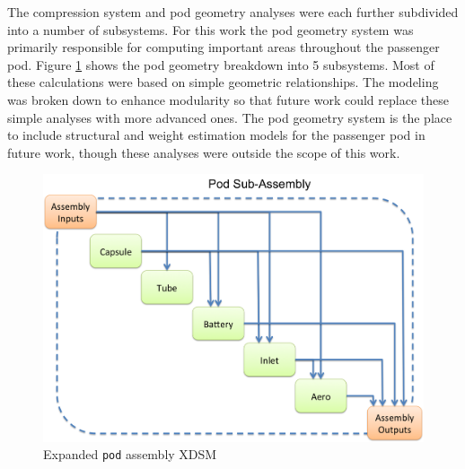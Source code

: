 \documentclass[heading.tex]{subfiles}
\begin{document}
The compression system and pod geometry analyses were each further subdivided into a number of subsystems. For this work the pod geometry 
system was primarily responsible for computing important areas throughout the passenger pod. Figure \ref{f:podXDSM} shows the 
pod geometry breakdown into 5 subsystems. Most of these calculations were based on simple geometric relationships. The 
modeling was broken down to enhance modularity so that future work could replace these simple analyses with more advanced ones.
The pod geometry system is the place to include structural and weight estimation models for the passenger pod in future work,
though these analyses were outside the scope of this work. 

\begin{figure}[hbtp]
\centering
\includegraphics[width=\textwidth]{images/podAssembly.png}
\caption{Expanded \texttt{pod} assembly XDSM}
\label{f:podXDSM}
\end{figure}
\end{document}
